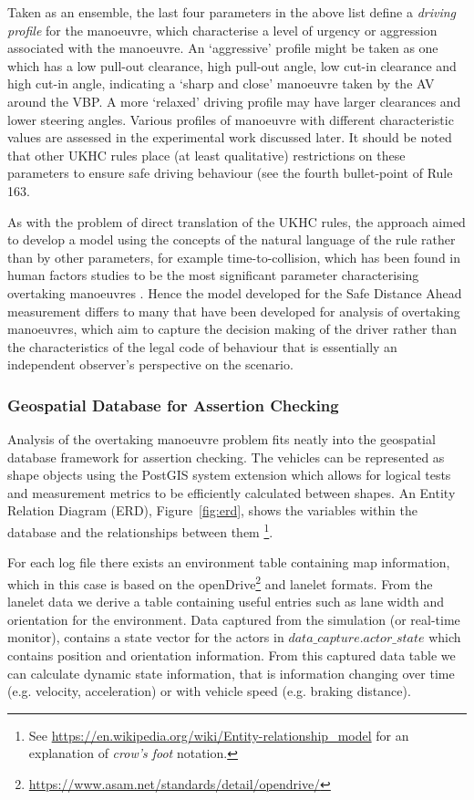 Taken as an ensemble, the last four parameters in the above list define a \emph{driving profile} for the manoeuvre, which characterise a level of urgency or aggression associated with the manoeuvre. An `aggressive' profile might be taken as one which has a low pull-out clearance, high pull-out angle, low cut-in clearance and high cut-in angle, indicating a `sharp and close' manoeuvre taken by the AV around the VBP. A more `relaxed' driving profile may have larger clearances and lower steering angles. Various profiles of manoeuvre with different characteristic values are assessed in the experimental work discussed later. It should be noted that other UKHC rules place (at least qualitative) restrictions on these parameters to ensure safe driving behaviour (see the fourth bullet-point of Rule 163.%

As with the problem of direct translation of the UKHC rules, the approach aimed to develop a model using the concepts of the natural language of the rule rather than by other parameters, for example time-to-collision, which has been found in human factors studies to be the most significant parameter characterising overtaking manoeuvres \cite{lenard2018, Chen2015}. Hence the model developed for the Safe Distance Ahead measurement differs to many that have been developed for analysis of overtaking manoeuvres, which aim to capture the decision making of the driver rather than the characteristics of the legal code of behaviour that is essentially an independent observer's perspective on the scenario.

\subsubsection{Geospatial Database for Assertion Checking}
Analysis of the overtaking manoeuvre problem fits neatly into the geospatial database framework for assertion checking. The vehicles can be represented as shape objects using the PostGIS system extension which allows for logical tests and measurement metrics to be efficiently calculated between shapes. An Entity Relation Diagram (ERD), Figure~\ref{fig:erd}, shows the variables within the database and the relationships between them \footnote{See \url{https://en.wikipedia.org/wiki/Entity-relationship\_model} for an explanation of \textit{crow's foot} notation.}. 

For each log file there exists an environment table containing map information, which in this case is based on the openDrive\footnote{\url{https://www.asam.net/standards/detail/opendrive/}} and lanelet formats. From the lanelet data we derive a table containing useful entries such as lane width and orientation for the environment. Data captured from the simulation (or real-time monitor), contains a state vector for the actors in $data\_capture.actor\_state$ which contains position and orientation information. From this captured data table we can calculate dynamic state information, that is information changing over time (e.g. velocity, acceleration) or with vehicle speed (e.g. braking distance). 

